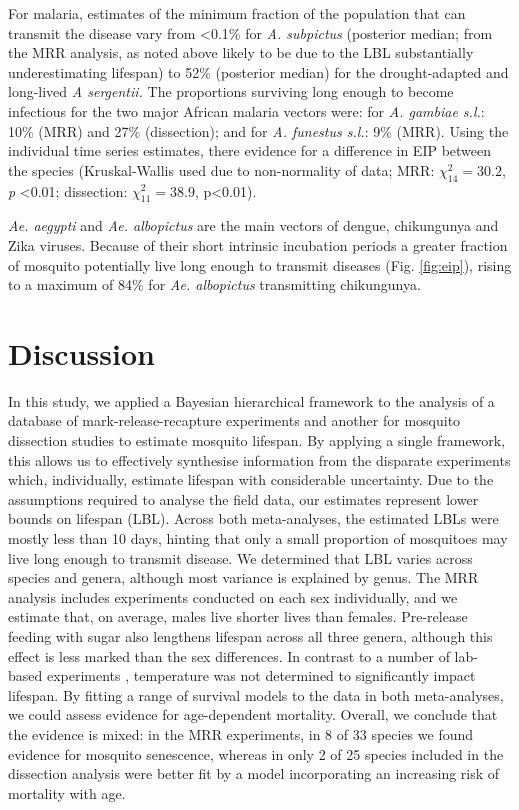 \documentclass[]{article}
\begin{document}
For malaria, estimates of the minimum fraction of the population that
can transmit the disease vary from \textless{}0.1\% for \emph{A.
subpictus} (posterior median; from the MRR analysis, as noted above likely to be due to
the LBL substantially underestimating lifespan) to 52\% (posterior median) for the
drought-adapted and long-lived \emph{A sergentii.} The proportions
surviving long enough to become infectious for the two major African
malaria vectors were: for \emph{A. gambiae s.l.}: 10\% (MRR) and 27\%
(dissection); and for \emph{A. funestus s.l.}: 9\% (MRR). Using the
individual time series estimates, there
evidence for a difference in EIP between the species (Kruskal-Wallis used due to non-normality of data; MRR:
\(\chi_{14}^{2} = 30.2\), \emph{p} \textless{}0.01; dissection: \(\chi_{11}^{2} = 38.9\), p\textless{}0.01).

\emph{Ae. aegypti} and \emph{Ae. albopictus} are the main vectors of
dengue, chikungunya and Zika viruses. Because of their short intrinsic
incubation periods a greater fraction of mosquito potentially live long
enough to transmit diseases (Fig. \ref{fig:eip}), rising to a maximum of 84\% for
\emph{Ae. albopictus} transmitting chikungunya.

\section{Discussion}\label{discussion}

In this study, we applied a Bayesian hierarchical framework to the
analysis of a database of mark-release-recapture experiments and another for mosquito dissection studies to estimate mosquito lifespan.
By applying a single framework, this allows us to effectively synthesise
information from the disparate experiments which, individually, estimate
lifespan with considerable uncertainty. Due to the assumptions required
to analyse the field data, our estimates represent lower bounds on
lifespan (LBL). Across both meta-analyses, the estimated LBLs were
mostly less than 10 days, hinting that only a small proportion of
mosquitoes may live long enough to transmit disease. We determined that
LBL varies across species and genera, although most variance is
explained by genus. The MRR analysis includes experiments conducted on
each sex individually, and we estimate that, on average, males live
shorter lives than females. Pre-release feeding with sugar also
lengthens lifespan across all three genera, although this effect is less
marked than the sex differences. In contrast to a number of lab-based
experiments \citep{yang2009assessing,brady2013modelling}, temperature was not determined to significantly impact
lifespan. By fitting a range of survival models to the data in both
meta-analyses, we could assess evidence for age-dependent mortality.
Overall, we conclude that the evidence is mixed: in the MRR experiments,
in 8 of 33 species we found evidence for mosquito senescence, whereas in
only 2 of 25 species included in the dissection analysis were better fit
by a model incorporating an increasing risk of mortality with age.
\end{document}
